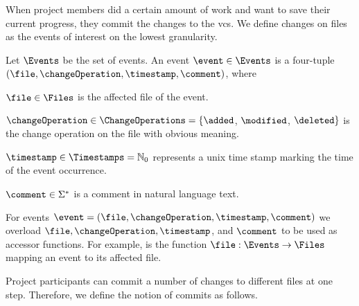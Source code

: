 When project members did a certain amount of work and want to save their current progress, they commit the changes to the \gls{vcs}.
We define changes on files as the events of interest on the lowest granularity.
\begin{definition}[Event] \label{def:bpm2015events}
Let $\Events$ %
be the set of events. An event $\event \in \Events$ is a four-tuple $(\file, \changeOperation, \timestamp, \comment)$, where
\begin{compactitem}
  \item $\file \in \Files$ is the affected file of the event.
  \item $\changeOperation \in \ChangeOperations =\lbrace\added$, $\modified$, $\deleted \rbrace$ is the change operation on the file with obvious meaning.
  \item $\timestamp \in \Timestamps = \mathbb{N}_0$ represents a unix time stamp marking the time of the event occurrence.
  \item $\comment \in \Sigma^*$ is a comment in natural language text.
\end{compactitem}
\end{definition}

For events $\event = (\file, \changeOperation, \timestamp, \comment%
)$ we overload $\file, \changeOperation, \timestamp$, and $\comment$
to be used as accessor functions. For example, \file is the function $\file : \Events \rightarrow \Files$ mapping an event to its affected file.

Project participants can commit a number of changes to different files at one step. Therefore, we define the notion of commits as follows.

